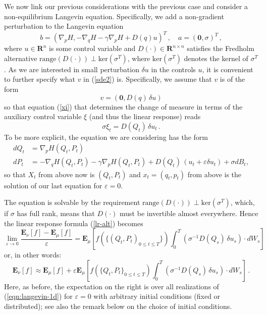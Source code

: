 \documentclass[]{tMPH2e}
\newcommand{\R}{{\mathbf R}}
\newcommand{\eps}{\varepsilon}
\newcommand{\bE}{{\mathbf E}}
\newcommand{\zero}{{\mathbf 0}}
\begin{document}
We now link our previous considerations with the previous case and consider a non-equilibrium Langevin equation. Specifically, we add a non-gradient perturbation to the Langevin equation 
\begin{equation}\label{eqn:langevin-1b}
b = \left(\nabla_{p}H, -\nabla_{q} H - \gamma\nabla_{p}H  + D(q) u \right)^{T}\,,\quad a= (\zero,\sigma)^{T}\,,
\end{equation}
where $u\in\R^{n}$ is some control variable and $D(\cdot)\in\R^{n\times n}$ satisfies the Fredholm alternative $\mathrm{range}(D(\cdot))\perp \mathrm{ker}(\sigma^{T})$, where $\mathrm{ker}(\sigma^T)$ denotes the kernel of $\sigma^T$. As we are interested in small perturbation $\delta u$ in the controls $u$, it is convenient to further specify what $v$ in (\ref{sde2}) is. Specifically, we assume that $v$ is of the form 
\begin{equation}\label{eqn:langevin-1c}
v = (\zero, D(q)\,\delta u)
\end{equation}
so that equation (\ref{xi}) that determines the change of measure in terms of the auxiliary control variable $\xi$ (and thus the linear response) reads 
\[
\sigma \xi_{t} = D(Q_{t})\,\delta u_{t}\,.
\]
To be more explicit, the equation we are considering has the form
\begin{equation}\label{eqn:langevin-1d}
\begin{aligned}
dQ_t & =  \nabla_p H(Q_t,P_t)\\
dP_t & =  -\nabla_q H(Q_t,P_t) - \gamma \nabla_p H(Q_t,P_t) + D(Q_t)\,(u_t+\eps \delta u_t)+\sigma dB_t,
\end{aligned}
\end{equation}
so that $X_t$ from above now is $(Q_t,P_t)$ and $x_t=(q_t,p_t)$ from above is the solution of our last equation for $\eps=0$.

The equation is solvable by the requirement  $\mathrm{range}(D(\cdot))\perp \mathrm{ker}(\sigma^{T})$, which, if $\sigma$ has full rank, means that $D(\cdot)$ must be invertible almost everywhere. Hence the linear response formula (\ref{lr-alt})  becomes
\begin{equation}\label{lr-alt2}
\lim_{\eps\to 0}\frac{\bE_{\nu}[f] - \bE_{\mu}[f]}{\eps} =  \bE_{\mu}\left[f(\{(Q_{t},P_{t})_{0\le t\le T}\})\int_{0}^{T}(\sigma^{-1}D(Q_{s})\,\delta u_{s})\cdot dW_{s} \right]\,
\end{equation}
or, in other words: 
\begin{equation}\label{eqn:neq-response}
\bE_{\nu}[f] \approx \bE_{\mu}[f] + \eps\bE_{\mu}\left[f(\{Q_{t},P_{t}\}_{0\le t\le T})\int_{0}^{T}(\sigma^{-1}D(Q_{s})\,\delta u_{s})\cdot dW_{s} \right]\,.
\end{equation}
Here, as before, the expectation on the right is over all realizations of (\ref{eqn:langevin-1d}) for $\eps=0$ with arbitrary initial conditions (fixed or distributed); see also the remark below on the choice of initial conditions. 
\end{document}
